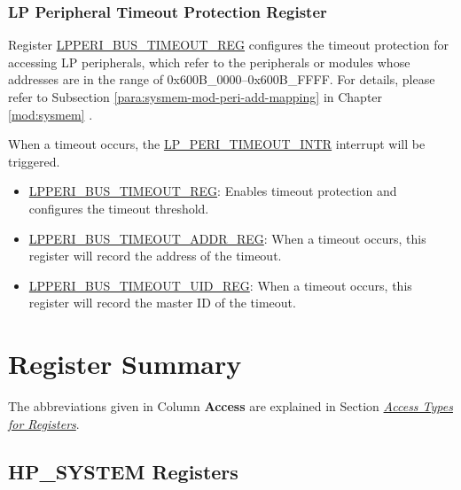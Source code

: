 \documentclass[main\_\_EN.tex]{subfiles}
\begin{document}
\subsubsection{LP Peripheral Timeout Protection Register}

Register \hyperref[regdesc:LPPERIBUSTIMEOUTREG]{LPPERI\_BUS\_TIMEOUT\_REG} configures the timeout protection for accessing LP peripherals, which refer to the peripherals or modules whose addresses are in the range of 0x600B\_0000–0x600B\_FFFF. For details, please refer to Subsection \ref{para:sysmem-mod-peri-add-mapping} \textit{} in Chapter \ref{mod:sysmem} \textit{}.


When a timeout occurs, the \hyperref[tab:peripheral-interrupt-config-status-source]{LP\_PERI\_TIMEOUT\_INTR} interrupt will be triggered.

\begin{itemize}
    \item \hyperref[regdesc:LPPERIBUSTIMEOUTREG]{LPPERI\_BUS\_TIMEOUT\_REG}: Enables timeout protection and configures the timeout threshold.
    \item \hyperref[regdesc:LPPERIBUSTIMEOUTADDRREG]{LPPERI\_BUS\_TIMEOUT\_ADDR\_REG}: When a timeout occurs, this register will record the address of the timeout.
    \item \hyperref[regdesc:LPPERIBUSTIMEOUTUIDREG]{LPPERI\_BUS\_TIMEOUT\_UID\_REG}: When a timeout occurs, this register will record the master ID of the timeout.
\end{itemize}




\clearpage
\hypertarget{sysreg-reg-summ}{}
\section{Register Summary}
\label{sec:sysreg-reg-summ}

The abbreviations given in Column \textbf{Access} are explained in Section \hyperref[glossary-access-types]{\textit{Access Types for Registers}}.

\subsection{HP\_SYSTEM Registers}
\label{sec:sysreg-reg-summ-sysreg}
\end{document}
